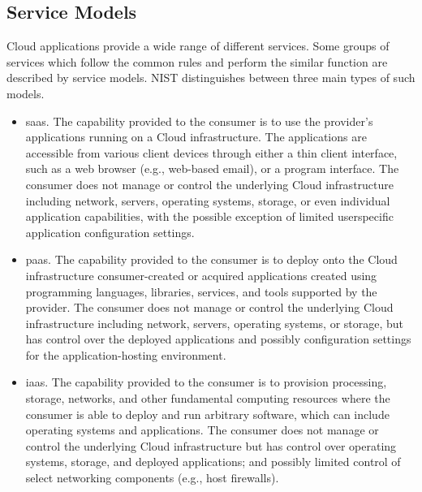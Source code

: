 \subsection*{Service Models}\label{def:servmod}
Cloud applications provide a wide range of different services.
Some groups of services which follow the common rules and perform the similar function are described by service models.
NIST distinguishes between three main types of such models.
\begin{itemize}
	\item  \gls{saas}. 
	The capability provided to the consumer is to use the provider’s applications running on a Cloud infrastructure. 
	The applications are accessible from various client devices through either a thin client interface, such as a web browser (e.g., web-based email), or a program interface. 
	The consumer does not manage or control the underlying Cloud infrastructure including network, servers, operating systems, storage, or even individual application capabilities, with the possible exception of limited userspecific application configuration settings.~\cite*{nist}
	\item \gls{paas}. 
	The capability provided to the consumer is to deploy onto the Cloud infrastructure consumer-created or acquired applications created using programming languages, libraries, services, and tools supported by the provider.
	The consumer does not manage or control the underlying Cloud infrastructure including network, servers, operating systems, or storage, but has control over the deployed applications and possibly configuration settings for the application-hosting environment.~\cite*{nist}
	\item \gls{iaas}.
	The capability provided to the consumer is to provision processing, storage, networks, and other fundamental computing resources where the
	consumer is able to deploy and run arbitrary software, which can include operating systems and applications.
	The consumer does not manage or control the underlying Cloud infrastructure but has control over operating systems, storage, and deployed applications; and possibly limited control of select networking components (e.g., host firewalls).~\cite*{nist}
\end{itemize}
